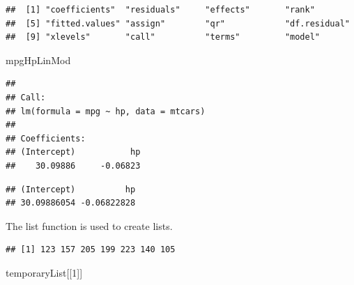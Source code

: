 \documentclass[]{article}
\newenvironment{Shaded}{\begin{snugshade}}{\end{snugshade}}
\newcommand{\KeywordTok}[1]{\textcolor[rgb]{0.13,0.29,0.53}{\textbf{#1}}}
\newcommand{\DataTypeTok}[1]{\textcolor[rgb]{0.13,0.29,0.53}{#1}}
\newcommand{\DecValTok}[1]{\textcolor[rgb]{0.00,0.00,0.81}{#1}}
\newcommand{\StringTok}[1]{\textcolor[rgb]{0.31,0.60,0.02}{#1}}
\newcommand{\OperatorTok}[1]{\textcolor[rgb]{0.81,0.36,0.00}{\textbf{#1}}}
\newcommand{\NormalTok}[1]{#1}
\begin{document}
\begin{verbatim}
##  [1] "coefficients"  "residuals"     "effects"       "rank"         
##  [5] "fitted.values" "assign"        "qr"            "df.residual"  
##  [9] "xlevels"       "call"          "terms"         "model"
\end{verbatim}

\begin{Shaded}
\begin{Highlighting}[]
\NormalTok{mpgHpLinMod}
\end{Highlighting}
\end{Shaded}

\begin{verbatim}
## 
## Call:
## lm(formula = mpg ~ hp, data = mtcars)
## 
## Coefficients:
## (Intercept)           hp  
##    30.09886     -0.06823
\end{verbatim}

\begin{Shaded}
\end{Shaded}

\begin{verbatim}
## (Intercept)          hp 
## 30.09886054 -0.06822828
\end{verbatim}

The list function is used to create lists.

\begin{Shaded}
\end{Shaded}

\begin{verbatim}
## [1] 123 157 205 199 223 140 105
\end{verbatim}

\begin{Shaded}
\begin{Highlighting}[]
\NormalTok{temporaryList[[}\DecValTok{1}\NormalTok{]]}
\end{Highlighting}
\end{Shaded}
\end{document}
